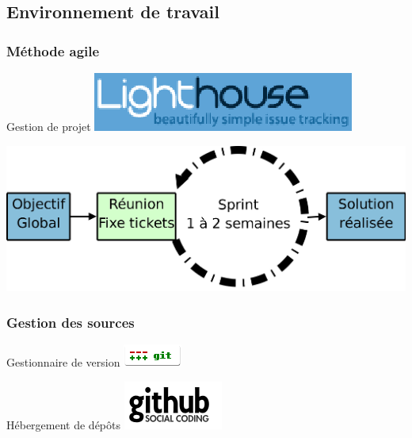 \subsection{Environnement de travail}
\begin{frame}\frametitle{Méthode agile}
\centering
\begin{minipage}[c]{.5\linewidth}
	\begin{beamerboxesrounded}[shadow=true]{Gestion de projet}
		\includegraphics[width=\linewidth]{../image/lighthouseLogo.png}
	\end{beamerboxesrounded}
\end{minipage}
\vfill
\includegraphics[width=1\linewidth]{../image/agileDev.png}
\end{frame}
\begin{frame}\frametitle{Gestion des sources}
\begin{centering}
	\begin{minipage}[c]{.6\linewidth}
		\begin{beamerboxesrounded}[shadow=true,center]{Gestionnaire de version}
			\centering
			\includegraphics[width=.4\linewidth]{../image/gitLogo.png}\hfil
		\end{beamerboxesrounded}
	\end{minipage}
	\vfill
	\begin{minipage}[c]{.6\linewidth}
		\begin{beamerboxesrounded}[shadow=true,center]{Hébergement de dépôts}
			\centering
			\includegraphics[width=.3\linewidth]{../image/githubLogo.png}
		\end{beamerboxesrounded}
	\end{minipage}
	\vfill
\end{centering}
\end{frame}
